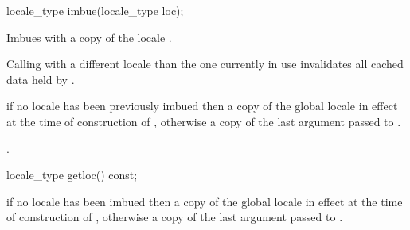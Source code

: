 %
%
\begin{itemdecl}
locale_type imbue(locale_type loc);
\end{itemdecl}

\begin{itemdescr}
\pnum
\effects  Imbues  with a copy of the
locale . \begin{note} Calling  with a
different locale than the one currently in use invalidates all cached
data held by . \end{note}

\pnum
\returns if no locale has been previously imbued then a copy of the
global locale in effect at the time of construction of ,
otherwise a copy of the last argument passed to .

\pnum
\postconditions  {}.
\end{itemdescr}

%
%
\begin{itemdecl}
locale_type getloc() const;
\end{itemdecl}

\begin{itemdescr}
\pnum
\returns if no locale has been imbued then a copy of the global locale
in effect at the time of construction of , otherwise a copy of
the last argument passed to .
\end{itemdescr}

